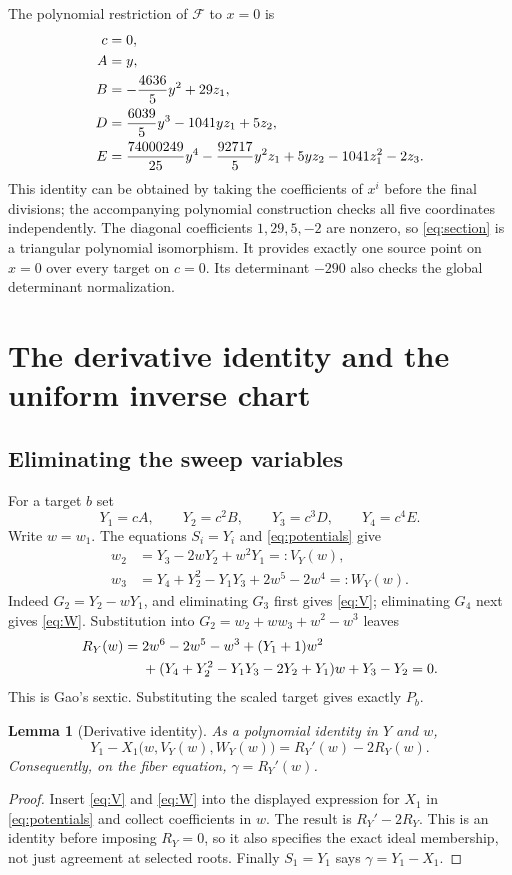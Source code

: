 \documentclass[11pt,a4paper]{article}
\newtheorem{lemma}[theorem]{Lemma}
\theoremstyle{definition}
\newcommand{\F}{\mathcal F}
\begin{document}
The polynomial restriction of $\F$ to $x=0$ is
\begin{align}
 c&=0,\notag\\
 A&=y,\notag\\
 B&=-\frac{4636}{5}y^2+29z_1,\label{eq:section}\\
 D&=\frac{6039}{5}y^3-1041yz_1+5z_2,\notag\\
 E&=\frac{74000249}{25}y^4-\frac{92717}{5}y^2z_1
       +5yz_2-1041z_1^2-2z_3.\notag
\end{align}
This identity can be obtained by taking the coefficients of $x^i$ before
the final divisions; the accompanying polynomial construction checks all
five coordinates independently. The diagonal coefficients $1,29,5,-2$
are nonzero, so \eqref{eq:section} is a triangular polynomial isomorphism.
It provides exactly one source point on $x=0$ over every target on $c=0$.
Its determinant $-290$ also checks the global determinant normalization.

\section{The derivative identity and the uniform inverse chart}
\label{sec:chart}

\subsection{Eliminating the sweep variables}
For a target $b$ set
\[
 Y_1=cA,\qquad Y_2=c^2B,\qquad Y_3=c^3D,\qquad Y_4=c^4E.
\]
Write $w=w_1$. The equations $S_i=Y_i$ and
\eqref{eq:potentials} give
\begin{align}
 w_2&=Y_3-2wY_2+w^2Y_1=:V_Y(w),\label{eq:V}\\
 w_3&=Y_4+Y_2^2-Y_1Y_3+2w^5-2w^4=:W_Y(w).\label{eq:W}
\end{align}
Indeed $G_2=Y_2-wY_1$, and eliminating $G_3$ first gives
\eqref{eq:V}; eliminating $G_4$ next gives \eqref{eq:W}.
Substitution into $G_2=w_2+ww_3+w^2-w^3$ leaves
\begin{align}
 R_Y(w)={}&2w^6-2w^5-w^3+(Y_1+1)w^2\notag\\
 &+(Y_4+Y_2^2-Y_1Y_3-2Y_2+Y_1)w+Y_3-Y_2=0.
 \label{eq:RY}
\end{align}
This is Gao's sextic. Substituting the scaled target gives exactly $P_b$.

\begin{lemma}[Derivative identity]\label{lem:derivative}
As a polynomial identity in $Y$ and $w$,
\begin{equation}\label{eq:derivative}
 Y_1-X_1\bigl(w,V_Y(w),W_Y(w)\bigr)=R_Y'(w)-2R_Y(w).
\end{equation}
Consequently, on the fiber equation, $\gamma=R_Y'(w)$.
\end{lemma}
\begin{proof}
Insert \eqref{eq:V} and \eqref{eq:W} into the displayed expression for
$X_1$ in \eqref{eq:potentials} and collect coefficients in $w$. The result
is $R_Y'-2R_Y$. This is an identity before imposing $R_Y=0$, so it
also specifies the exact ideal membership, not just agreement at selected
roots. Finally $S_1=Y_1$ says $\gamma=Y_1-X_1$.
\end{proof}
\end{document}
